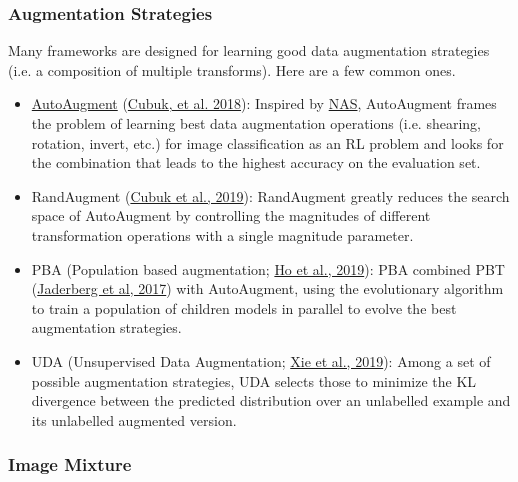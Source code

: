 \documentclass[12pt]{article}
\begin{document}
\subsubsection{Augmentation Strategies}

Many frameworks are designed for learning good data augmentation strategies (i.e. a composition of multiple transforms). Here are a few common ones.
\begin{itemize}
    \item \href{https://lilianweng.github.io/posts/2019-05-05-domain-randomization/#AutoAugment}{AutoAugment} (\href{https://arxiv.org/abs/1805.09501}{Cubuk, et al. 2018}): Inspired by \href{https://lilianweng.github.io/posts/2020-08-06-nas/}{NAS}, AutoAugment frames the problem of learning best data augmentation operations (i.e. shearing, rotation, invert, etc.) for image classification as an RL problem and looks for the combination that leads to the highest accuracy on the evaluation set.
    \item RandAugment (\href{https://arxiv.org/abs/1909.13719}{Cubuk et al., 2019}): RandAugment greatly reduces the search space of AutoAugment by controlling the magnitudes of different transformation operations with a single magnitude parameter.
    \item PBA (Population based augmentation; \href{https://arxiv.org/abs/1905.05393}{Ho et al., 2019}): PBA combined PBT (\href{https://arxiv.org/abs/1711.09846}{Jaderberg et al, 2017}) with AutoAugment, using the evolutionary algorithm to train a population of children models in parallel to evolve the best augmentation strategies.
    \item UDA (Unsupervised Data Augmentation; \href{https://arxiv.org/abs/1904.12848}{Xie et al., 2019}): Among a set of possible augmentation strategies, UDA selects those to minimize the KL divergence between the predicted distribution over an unlabelled example and its unlabelled augmented version.
\end{itemize}

\subsubsection{Image Mixture}
\end{document}
